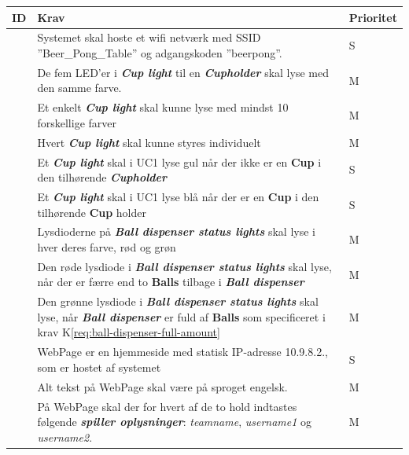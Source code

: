 \documentclass[Kravspecifikation/Kravspec_Main.tex]{subfiles}
\begin{document}
\begin{table}[H]
\centering
\begin{tabular}{|L{0.1\textwidth}|L{0.65\textwidth}|L{0.15\textwidth}|}
\hline
\textbf{ID} & \textbf{Krav} & \textbf{Prioritet} \\ \hline
\subreq{} \label{req:wifi-name}& Systemet skal hoste et wifi netværk med SSID ''Beer\_Pong\_Table'' og adgangskoden ''beerpong''. & S\\ \hline
\subreq{} \label{req:led-same-color} & De fem LED'er i \textit{\textbf{Cup light}} til en \textit{\textbf{Cupholder}} skal lyse med den samme farve. & M\\ \hline
\subreq{} \label{req:color-count} & Et enkelt \textit{\textbf{Cup light}} skal kunne lyse med mindst 10 forskellige farver & M\\ \hline
\subreq{} \label{req:color-control} & Hvert \textit{\textbf{Cup light}} skal kunne styres individuelt & M\\ \hline 
\subreq{} \label{req:missing-cup-color} & Et \textit{\textbf{Cup light}} skal i UC1 lyse gul når der ikke er en \textbf{Cup} i den tilhørende \textit{\textbf{Cupholder}}  & S\\ \hline
\subreq{} \label{req:placed-cup-color} & Et \textit{\textbf{Cup light}} skal i UC1 lyse blå når der er en \textbf{Cup} i den tilhørende \textbf{Cup} holder & S\\ \hline
\subreq{} \label{req:status-colors} & Lysdioderne på \textit{\textbf{Ball dispenser status lights}} skal lyse i hver deres farve, rød og grøn & M \\ \hline
\subreq{} \label{req:status-empty-light} & Den røde lysdiode i \textit{\textbf{Ball dispenser status lights}} skal lyse, når der er færre end to \textbf{Balls} tilbage i \textit{\textbf{Ball dispenser}} & M \\ \hline
\subreq{} \label{req:status-full-light}& Den grønne lysdiode i \textit{\textbf{Ball dispenser status lights}} skal lyse, når \textit{\textbf{Ball dispenser}} er fuld af \textbf{Balls} som specificeret i krav K\ref{req:ball-dispenser-full-amount} & M  \\ \hline
\subreq{} \label{req:webpage-address} & WebPage er en hjemmeside med statisk IP-adresse 10.9.8.2., som er hostet af systemet & S\\ \hline
\subreq{} \label{req:webpage-language} & Alt tekst på WebPage skal være på sproget engelsk. & M\\ \hline
\subreq{} \label{req:webpage-info-type} & På WebPage skal der for hvert af de to hold indtastes følgende \textit{\textbf{spiller oplysninger}}: \textit{teamname}, \textit{username1} og \textit{username2}. & M\\ \hline

\end{tabular}
\end{table}
\end{document}
